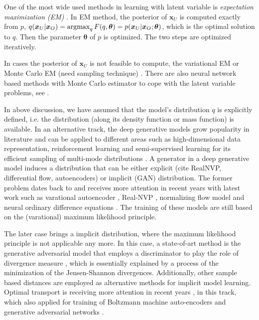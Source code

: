 One of the most wide used methods in learning with latent variable is \textit{expectation maximization (EM)} \cite{DEMP1977em}. In EM method, the posterior of $\bm{x}_U$ is computed exactly from $p$, $q(\bm{x}_U|\bm{x}_O) = \operatorname{argmax}_{q}{F(q, \bm{\theta})} = p(\bm{x}_U|\bm{x}_O; \bm{\theta})$, which is the optimal solution to $q$. Then the parameter $\bm{\theta}$ of $p$ is optimized. The two steps are optimized iteratively.

In cases the posterior of $\bm{x}_U$ is not feasible to compute, the variational EM\cite[section~6.2.2]{wainwright2008graphical} or Monte Carlo EM (need sampling technique) \cite{neath2012convergence}. There are also neural network based methods with Monte Carlo estimator to cope with the latent variable problems, see \cite{DBLP:journals/corr/KingmaW13}\cite{kuleshov2017NVIL, lazarogredilla2019learning, goodfellow2014gan}.


In above discussion, we have assumed that the model's distribution $q$ is explicitly defined, i.e. the distribution (along its density function or mass function) is available. In an alternative track, the deep generative models grow popularity in literature and can be applied to different areas such as high-dimensional data representation, reinforcement learning and semi-supervised learning for its efficient sampling of multi-mode distributions \cite{2017arXiv170100160G}. A generator in a deep generative model induces a distribution that can be either explicit (cite RealNVP, differential flow, autoencoders) or implicit (GAN) distribution. The former problem dates back to \cite{deco1995high-order} and receives more attention in recent years with latest work such as varational autoencoder \cite{DBLP:journals/corr/KingmaW13}, Real-NVP \cite{2016arXiv160508803D}, normalizing flow model \cite{2018arXiv180703039K} and neural ordinary difference equations \cite{ricky2018ODE}. The training of these models are still based on the (varational) maximum likelihood principle.

The later case brings a implicit distribution, where the maximum likelihood principle is not applicable any more. In this case, a state-of-art method is the generative adversarial model that employs a discriminator to play the role of divergence measure \cite{goodfellow2014gan, 2017arXiv170104862A}\cite{NIPS2016_6125}, which is essentially explained by a process of the minimization of the Jensen-Shannon divergences. Additionally, other sample based distances are employed as alternative methods for implicit model learning. Optimal transport is receiving more attention in recent years \cite{santambrogio2015optimal},\cite{2013arXiv1306.0895C} in this track, which also applied for training of Boltzmann machine \cite{NIPS2016_6248} auto-encoders\cite{2017arXiv171101558T} and generative adversarial networks \cite{2017arXiv170107875A}.


